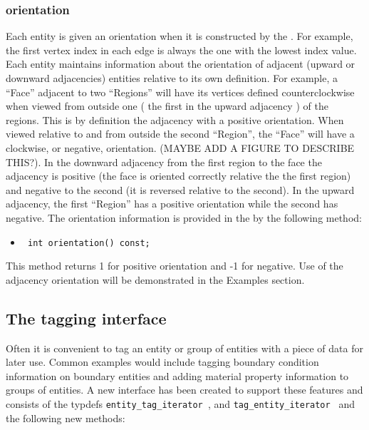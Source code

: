 \subsubsection{\umapAI orientation}
Each entity is given an orientation when it is constructed by the
\umap.  For example, the first vertex index in each edge is always the
one with the lowest index value.  Each entity maintains information
about the orientation of adjacent (upward or downward adjacencies)
entities relative to its own definition.  For example, a ``Face''
adjacent to two ``Regions'' will have its vertices defined
counterclockwise when viewed from outside one ( the first in the
upward adjacency ) of the regions.  This is by definition the
adjacency with a positive orientation.  When viewed relative to and
from outside the second ``Region'', the ``Face'' will have a
clockwise, or negative, orientation.  (MAYBE ADD A FIGURE TO DESCRIBE THIS?).
In the downward adjacency from the first region to the face the adjacency is
positive (the face is oriented correctly relative the the first region) and
negative to the second (it is reversed relative to the second).  In the upward
adjacency, the first ``Region'' has a positive orientation while the second
has negative.  The orientation information is provided in the \umapAI by the following
method:
\begin{itemize}
\item \begin{verbatim} int orientation() const; \end{verbatim}
\end{itemize}
This method returns 1 for positive orientation and -1 for negative.
Use of the adjacency orientation will be demonstrated in the Examples
section.

\subsection{The tagging interface}
Often it is convenient to tag an entity or group of entities with a
piece of data for later use.  Common examples would include tagging
boundary condition information on boundary entities and adding
material property information to groups of entities.  A new interface
has been created to support these features and consists of the typdefs
{\tt entity\_tag\_iterator }, and {\tt tag\_entity\_iterator } and the following
new methods:

